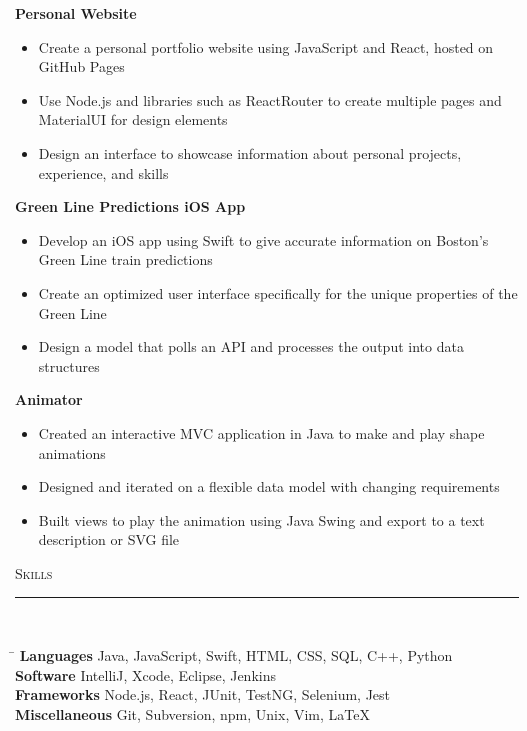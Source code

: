 \documentclass[11pt]{article}
\begin{document}
\begin{raggedright}
	\textbf{\large Personal Website} 
	\begin{itemize}
		\item Create a personal portfolio website using JavaScript and React, hosted on GitHub Pages
		\item Use Node.js and libraries such as ReactRouter to create multiple pages and MaterialUI for design elements
		\item Design an interface to showcase information about personal projects, experience, and skills
	\end{itemize}
	\vspace{0.1in}
	
	\textbf{\large Green Line Predictions iOS App} 
	\begin{itemize}
		\item Develop an iOS app using Swift to give accurate information on Boston's Green Line train predictions
		\item Create an optimized user interface specifically for the unique properties of the Green Line
		\item Design a model that polls an API and processes the output into data structures
	\end{itemize}
	\vspace{0.1in}
	
	\textbf{\large Animator} 
	\begin{itemize}
		\item Created an interactive MVC application in Java to make and play shape animations
		\item Designed and iterated on a flexible data model with changing requirements
		\item Built views to play the animation using Java Swing and export to a text description or SVG file 
	\end{itemize}
	\vspace{0.1in}
	
	
	\textsc{\Large Skills} \\
	\vspace{-0.1in}
	\rule{\textwidth}{0.4pt} \\
	\vspace{0.05in}

	\begin{tabbing}
		\hspace*{4cm}\= \kill
		\textbf{Languages}  \> Java, JavaScript, Swift, HTML, CSS, SQL, C++, Python \\
		\textbf{Software} \> IntelliJ, Xcode, Eclipse, Jenkins \\
		\textbf{Frameworks} \> Node.js, React, JUnit, TestNG, Selenium, Jest \\
		\textbf{Miscellaneous} \> Git, Subversion, npm, Unix, Vim, LaTeX \\
	\end{tabbing}

	
\end{raggedright}	
\end{document}

